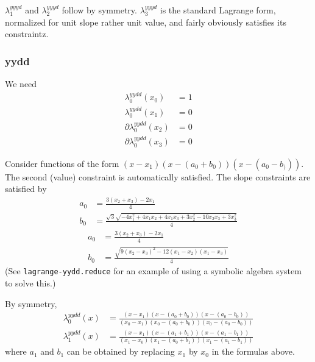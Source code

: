 $\lambda^{yyyd}_1$ and $\lambda^{yyyd}_2$ follow by symmetry.
$\lambda^{yyyd}_3$ is the standard Lagrange form,
normalized for unit slope rather unit value, and fairly obviously
satisfies its constraintz.
 
\subsubsection{yydd}

We need 
\begin{align}
\lambda^{yydd}_0(x_0) & = 1 \\ 
\lambda^{yydd}_0(x_1) & = 0 \nonumber \\
\partial\lambda^{yydd}_0(x_2) & = 0 \nonumber \\
\partial\lambda^{yydd}_0(x_3) & = 0 \nonumber 
\end{align}

Consider functions of the form $(x-x_1)(x-(a_0+b_0))(x-(a_0-b_)))$.
The second (value) constraint is automatically satisfied.
The slope constraints are satisfied by
\begin{align}
a_0 & = \frac{3 (x_2 + x_3) - 2 x_1}{4} \\ 
b_0 & = \frac{
\sqrt{3}
\sqrt{
- 4 x_1^{2} 
+ 4 x_1 x_2 
+ 4 x_1 x_3 
+ 3 x_2^{2}
- 10 x_2 x_3
+ 3 x_3^{2}
}
}
{4} \nonumber
\end{align}
\begin{align}
a_0 & = \frac{3 (x_2 + x_3) - 2 x_1}{4} \\ 
b_0 & = \frac{
\sqrt{ 9 (x_2 - x_3)^2 - 12 (x_1 - x_2) (x_1 -x_3)}
}
{4} \nonumber
\end{align}
(See \texttt{lagrange-yydd.reduce} for an example of using a
symbolic algebra system to solve this.)

By symmetry,  
\begin{align}
\lambda^{yydd}_0(x) & =
\frac{(x-x_1)(x-(a_0+b_0))(x-(a_0-b_0))}
{(x_0-x_1)(x_0-(a_0+b_0))(x_0-(a_0-b_0))}
\\
\lambda^{yydd}_1(x) & =
\frac{(x-x_1)(x-(a_1+b_1))(x-(a_1-b_1))}
{(x_1-x_0)(x_1-(a_0+b_1))(x_1-(a_1-b_1))}
\nonumber
\end{align}
where $a_1$ and $b_1$ can be obtained 
by replacing $x_1$ by $x_0$ in the formulas
above.

